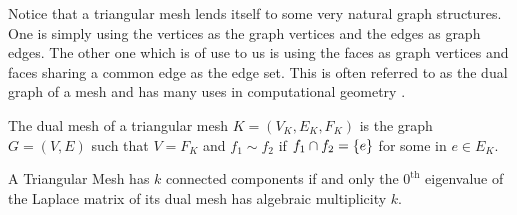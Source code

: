 \documentclass[12pt]{article}
\begin{document}
Notice that a triangular mesh lends itself to some very natural graph structures. One is simply using the vertices as the graph vertices and the edges as graph edges. The other one which is of use to us is using the faces as graph vertices and faces sharing a common edge as the edge set. This is often referred to as the dual graph of a mesh and has many uses in computational geometry \cite{kimSpectralCodingThreeDimensional2005}.

\begin{definition}
    The dual mesh of a triangular mesh $K = (V_K, E_K, F_K)$ is the graph $G = (V, E)$ such that $V = F_K$ and $f_1 \sim f_2$ if $f_1 \cap f_2 = \qty{e}$ for some in $e \in E_K$.
\end{definition}


\begin{theorem}
    A Triangular Mesh has $k$ connected components if and only the $0^\text{th}$ eigenvalue of the Laplace matrix of its dual mesh has algebraic multiplicity $k$.
\end{theorem}

\newpage

\nocite{merrisLaplacianMatricesGraphs1994}
\printbibliography
\end{document}
